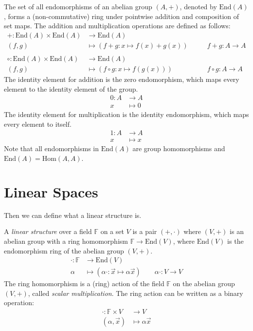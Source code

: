 \documentclass[
	11pt, %
	fleqn, %
	a4paper, %
]{LegrandOrangeBook}
\newcommand{\End}[1]{\text{End}(#1)} %
\newcommand{\Hom}[2]{\text{Hom}(#1, #2)} %
\newcommand{\F}{\mathbb{F}} %
\begin{document}
\begin{definition}
    The set of all endomorphisms of an abelian group $(A, +)$, denoted by $\End{A}$, forms a (non-commutative) ring under pointwise addition and composition of set maps. The addition and multiplication operations are defined as follows:
    \[
        \begin{split}
            + : \End{A} \times \End{A} &\to \End{A} \\
            (f,g) &\mapsto (f+g: x \mapsto f(x) + g(x)) \qquad &f + g : A \to A \\ \\
            \circ : \End{A} \times \End{A} &\to \End{A} \\
            (f,g) &\mapsto (f \circ g: x \mapsto f(g(x))) \qquad &f \circ g : A \to A
        \end{split}
    \]
    The identity element for addition is the zero endomorphism, which maps every element to the identity element of the group. 
    \[ \begin{split}
        0: A &\to A \\
        x &\mapsto 0
    \end{split}
    \]
    The identity element for multiplication is the identity endomorphism, which maps every element to itself. 
    \[
    \begin{split}
        1: A &\to A \\
        x &\mapsto x
    \end{split}
    \]
    Note that all endomorphisms in $\End{A}$ are group homomorphisms and $\End{A} = \Hom{A}{A}$.
\end{definition}

\newpage

\section{Linear Spaces}

Then we can define what a linear structure is.

\begin{definition}
    A \emph{linear structure} over a field $\F$ on a set $V$ is a pair $(+, \cdot)$ where $(V, +)$ is an abelian group with a ring homomorphism $\F \to \End{V}$, where $\End{V}$ is the endomorphism ring of the abelian group $(V, +)$.
    \[ \begin{split}
            \cdot : \F &\to \End{V} \\
            \alpha &\mapsto (\alpha\cdot : \vec{x} \mapsto \alpha \vec{x}) \qquad \alpha \cdot : V \to V
        \end{split}
    \]
    The ring homomorphism is a (ring) action of the field $\F$ on the abelian group $(V, +)$, called \emph{scalar multiplication}. The ring action can be written as a binary operation:
    \[
        \begin{split}
            \cdot : \F \times V &\to V \\
            (\alpha, \vec{x}) &\mapsto \alpha \vec{x}
        \end{split}
    \]
\end{definition}
\end{document}
